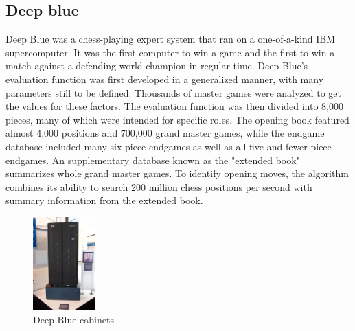 \documentclass[10pt,twocolumn]{article}
\begin{document}
\subsection{Deep blue}
    Deep Blue was a chess-playing expert system that ran on a one-of-a-kind IBM supercomputer. It was the first computer to win a game and the first to win a match against a defending world champion in regular time.
    Deep Blue's evaluation function was first developed in a generalized manner, with many parameters still to be defined. Thousands of master games were analyzed to get the values for these factors. The evaluation function was then divided into 8,000 pieces, many of which were intended for specific roles. The opening book featured almost 4,000 positions and 700,000 grand master games, while the endgame database included many six-piece endgames as well as all five and fewer piece endgames. An supplementary database known as the "extended book" summarizes whole grand master games. To identify opening moves, the algorithm combines its ability to search 200 million chess positions per second with summary information from the extended book.
    \begin{figure}
        \includegraphics[width=90]{Deep_Blue.jpg}
        \caption{Deep Blue cabinets}
        \label{fig2:Deep Blue}
    \end{figure}
    
\end{document}
